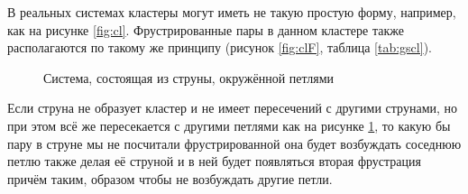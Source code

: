 \documentclass[utf8, babel, sor, jor, amsmath, amssymb, reprint]{elsarticle} %
\begin{document}
В реальных системах кластеры могут иметь не такую простую форму, например, как на рисунке \ref{fig:cl}. Фрустрированные пары в данном кластере также располагаются по такому же принципу (рисунок \ref{fig:clF}, таблица \ref{tab:gscl}).


\begin{figure}[h]
	\centering
	\caption{Система, состоящая из струны, окружённой петлями}
	\label{fig:4x4}
\end{figure}

Если струна не образует кластер и не имеет пересечений с другими струнами, но при этом всё же пересекается с другими петлями как на рисунке \ref{fig:4x4}, то какую бы пару в струне мы не посчитали фрустрированной она будет возбуждать соседнюю петлю также делая её струной и в ней будет появляться вторая фрустрация причём таким, образом чтобы не возбуждать другие петли. 
\end{document}
